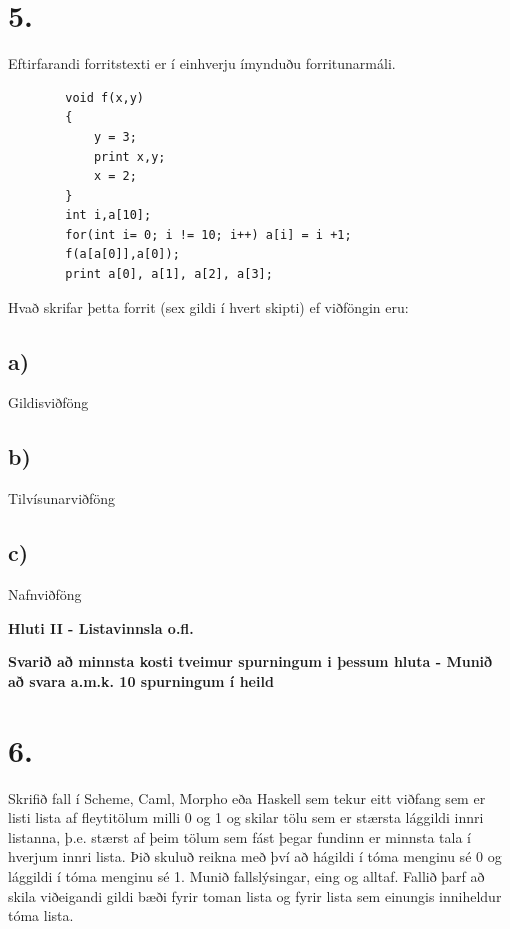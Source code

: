 \documentclass{article}
\begin{document}
     \newpage

     \section{5.}
     Eftirfarandi forritstexti er í einhverju ímynduðu forritunarmáli.
     \begin{verbatim}
        void f(x,y)
        {
            y = 3;
            print x,y;
            x = 2;
        }
        int i,a[10];
        for(int i= 0; i != 10; i++) a[i] = i +1;
        f(a[a[0]],a[0]);
        print a[0], a[1], a[2], a[3];
     \end{verbatim}

     Hvað skrifar þetta forrit (sex gildi í hvert skipti) ef viðföngin eru:

     \subsection{a)} Gildisviðföng 

     \subsection{b)} Tilvísunarviðföng

     \subsection{c)} Nafnviðföng


     \newpage

     \begin{center}
        \textbf{Hluti II - Listavinnsla o.fl.}


        \textbf{Svarið að minnsta kosti tveimur spurningum i þessum hluta - Munið að svara a.m.k. 10 spurningum í heild}
     \end{center}

     \section{6.}
     Skrifið fall í Scheme, Caml, Morpho eða Haskell sem tekur eitt viðfang sem er listi lista af fleytitölum milli 0 og 1 og skilar tölu sem 
     er stærsta lággildi innri listanna, þ.e. stærst af þeim tölum sem fást 
     þegar fundinn er minnsta tala í hverjum innri lista. Þið skuluð reikna
     með því að hágildi í tóma menginu sé 0 og lággildi í tóma menginu sé 1.
     Munið fallslýsingar, eing og alltaf. Fallið þarf að skila viðeigandi 
     gildi bæði fyrir toman lista og fyrir lista sem einungis inniheldur tóma lista.
\end{document}
